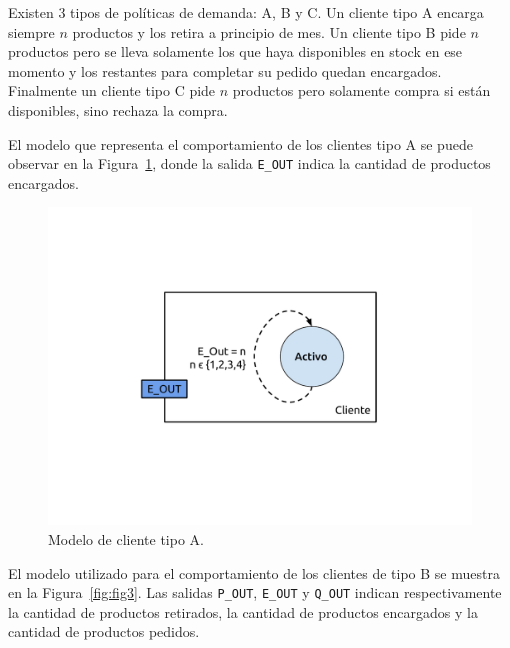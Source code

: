 \documentclass[10pt]{article}
\begin{document}
Existen 3 tipos de políticas de demanda: A, B y C. Un cliente tipo A encarga siempre $n$ productos y los retira a principio de mes. Un cliente tipo B pide $n$ productos pero se lleva solamente los que haya disponibles en stock en ese momento y los restantes para completar su pedido quedan encargados. Finalmente un cliente tipo C pide $n$ productos pero solamente compra si están disponibles, sino rechaza la compra.

El modelo que representa el comportamiento de los clientes tipo A se puede observar en la Figura~\ref{fig:fig2}, donde la salida \texttt{E\_OUT} indica la cantidad de productos encargados.

\begin{figure}
\centering
\includegraphics[scale=1]{img/figura2}
\caption{Modelo de cliente tipo A.}
\label{fig:fig2}
\end{figure}

El modelo utilizado para el comportamiento de los clientes de tipo B se muestra en la Figura~\ref{fig:fig3}. Las salidas \texttt{P\_OUT}, \texttt{E\_OUT} y \texttt{Q\_OUT} indican respectivamente la cantidad de productos retirados, la cantidad de productos encargados y la cantidad de productos pedidos.
\end{document}
